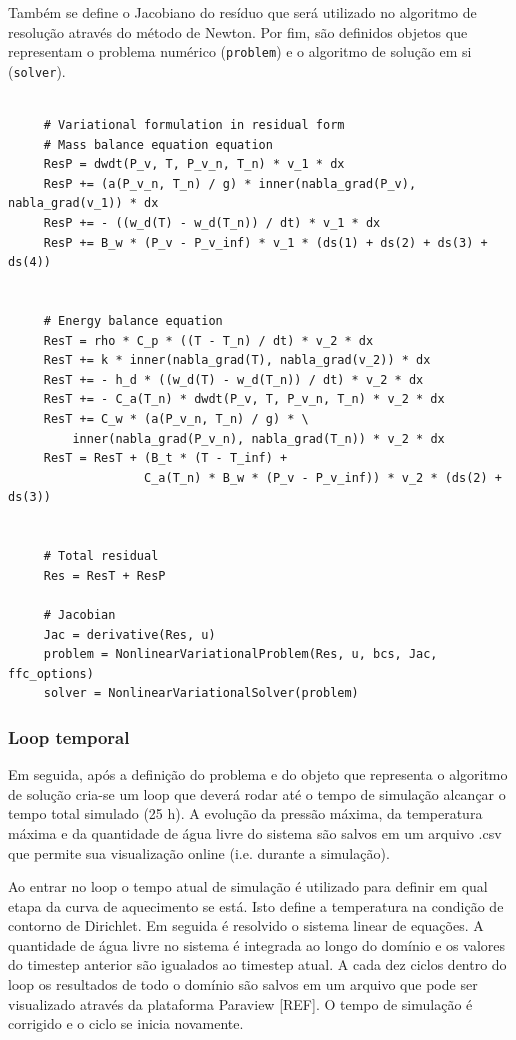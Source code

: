     Também se define o Jacobiano do resíduo que será utilizado no algoritmo de
    resolução através do método de Newton. Por fim, são definidos objetos que
    representam o problema numérico (\texttt{problem}) e o algoritmo de solução em si (\texttt{solver}).
    
    \begin{verbatim}

     # Variational formulation in residual form
     # Mass balance equation equation
     ResP = dwdt(P_v, T, P_v_n, T_n) * v_1 * dx
     ResP += (a(P_v_n, T_n) / g) * inner(nabla_grad(P_v), nabla_grad(v_1)) * dx
     ResP += - ((w_d(T) - w_d(T_n)) / dt) * v_1 * dx
     ResP += B_w * (P_v - P_v_inf) * v_1 * (ds(1) + ds(2) + ds(3) + ds(4))


     # Energy balance equation
     ResT = rho * C_p * ((T - T_n) / dt) * v_2 * dx
     ResT += k * inner(nabla_grad(T), nabla_grad(v_2)) * dx
     ResT += - h_d * ((w_d(T) - w_d(T_n)) / dt) * v_2 * dx
     ResT += - C_a(T_n) * dwdt(P_v, T, P_v_n, T_n) * v_2 * dx
     ResT += C_w * (a(P_v_n, T_n) / g) * \
         inner(nabla_grad(P_v_n), nabla_grad(T_n)) * v_2 * dx
     ResT = ResT + (B_t * (T - T_inf) +
                   C_a(T_n) * B_w * (P_v - P_v_inf)) * v_2 * (ds(2) + ds(3))


     # Total residual
     Res = ResT + ResP

     # Jacobian
     Jac = derivative(Res, u)
     problem = NonlinearVariationalProblem(Res, u, bcs, Jac, ffc_options)
     solver = NonlinearVariationalSolver(problem)
    \end{verbatim} 

    \subsubsection{Loop temporal}
    Em seguida, após a definição do problema e do objeto que representa o
    algoritmo de solução cria-se um loop que deverá rodar até o tempo de
    simulação alcançar o tempo total simulado (25 h). A evolução da pressão
    máxima, da temperatura máxima e da quantidade de água livre do sistema são
    salvos em um arquivo .csv que permite sua visualização online (i.e. durante
    a simulação).

    Ao entrar no loop o tempo atual de simulação é utilizado para
    definir em qual etapa da curva de aquecimento se está. Isto define a
    temperatura na condição de contorno de Dirichlet. Em seguida é resolvido o
    sistema linear de equações. A quantidade de água livre no sistema é
    integrada ao longo do domínio e os valores do timestep anterior são
    igualados ao timestep atual. A cada dez ciclos dentro do loop os resultados
    de todo o domínio são salvos em um arquivo que pode ser visualizado através
    da plataforma Paraview [REF]. O tempo de simulação é corrigido e o ciclo se
    inicia novamente.

